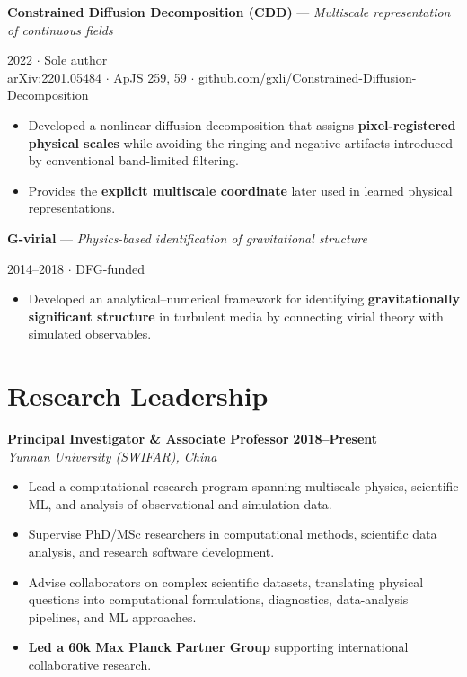 \documentclass[10pt]{article}
\begin{document}
\textbf{Constrained Diffusion Decomposition (CDD)} --- \textit{Multiscale representation of
continuous fields}

\hfill{\small\color{contactgray} 2022 $\cdot$ Sole author}\\[2pt]
{\small\href{https://arxiv.org/abs/2201.05484}{arXiv:2201.05484} $\cdot$ ApJS 259, 59 $\cdot$
\href{https://github.com/gxli/Constrained-Diffusion-Decomposition}{github.com/gxli/Constrained-Diffusion-Decomposition}}
\begin{itemize}
  \item Developed a nonlinear-diffusion decomposition that assigns \textbf{pixel-registered physical
        scales} while avoiding the ringing and negative artifacts introduced by conventional
        band-limited filtering.
  \item Provides the \textbf{explicit multiscale coordinate} later used in learned physical
        representations.
\end{itemize}
\vspace{4pt}

\textbf{G-virial} --- \textit{Physics-based identification of gravitational structure}

\hfill{\small\color{contactgray} 2014--2018 $\cdot$ DFG-funded}\\[2pt]
\begin{itemize}
  \item Developed an analytical--numerical framework for identifying \textbf{gravitationally
        significant structure} in turbulent media by connecting virial theory with simulated
        observables.
\end{itemize}
\vspace{4pt}

\section*{Research Leadership}

\textbf{Principal Investigator \& Associate Professor} \hfill \textbf{2018--Present}\\
\textit{Yunnan University (SWIFAR), China}\\
\begin{itemize}
  \item Lead a computational research program spanning multiscale physics, scientific ML, and
        analysis of observational and simulation data.
  \item Supervise PhD/MSc researchers in computational methods, scientific data analysis, and
        research software development.
  \item Advise collaborators on complex scientific datasets, translating physical questions into
        computational formulations, diagnostics, data-analysis pipelines, and ML approaches.
  \item \textbf{Led a \texteuro60k Max Planck Partner Group} supporting international collaborative
        research.
\end{itemize}
\end{document}
